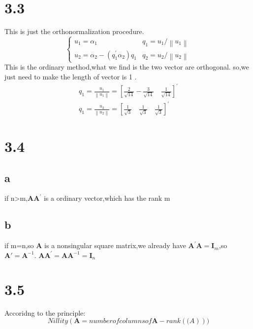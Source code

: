 \documentclass{article}
\begin{document}
\section*{3.3}
This is just the orthonormalization procedure.
$$
\left\{\begin{array}{ll}
u_{1}=\alpha_{1} & q_{1}=u_{1} /\left\|u_{1}\right\| \\
u_{2}=\alpha_{2}-\left(q_{1}^{\prime} \alpha_{2}\right) q_{1} & q_{2}=u_{2} /\left\|u_{2}\right\|
\end{array}\right.
$$
This is the ordinary method,what we find is the two vector are orthogonal. so,we just need to make the length of vector is 1 .
$$
\begin{array}{c}
q_{1}=\frac{u_{1}}{\left\|u_{1}\right\|}=\left[\frac{2}{\sqrt{14}}-\frac{3}{\sqrt{14}} \quad \frac{1}{\sqrt{14}}\right]^{\prime} \\
q_{1}=\frac{u_{2}}{\left\|u_{2}\right\|}=\left[\frac{1}{\sqrt{3}} \quad \frac{1}{\sqrt{3}} \quad \frac{1}{\sqrt{3}}\right]^{\prime}
\end{array}
$$

\section*{3.4}
\subsection*{a}
if n>m,$\boldsymbol{AA}^{'}$ is a ordinary vector,which has the rank m\\
\subsection*{b}
if m=n,so $\boldsymbol{A}$ is a nonsingular square matrix,we already have $\boldsymbol{A}^{'}\boldsymbol{A}=\boldsymbol{I}_m$,so $\boldsymbol{A}'=\boldsymbol{A}^{-1}$.
$\boldsymbol{AA}^{'}=\boldsymbol{A}\boldsymbol{A}^{-1}=\boldsymbol{I}_n$

\section*{3.5}
Accoridng to the principle:\\
\[Nillity(\boldsymbol{A}=number of columns of \boldsymbol{A}-rank(\boldsymbol(A)))\]
\end{document}
